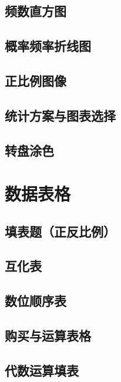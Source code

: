 \section{频数直方图}


\section{概率频率折线图}


\section{正比例图像}


\section{统计方案与图表选择}


\section{转盘涂色}


\chapter{数据表格}

\section{填表题（正反比例）}


\section{互化表}


\section{数位顺序表}


\section{购买与运算表格}


\section{代数运算填表}


